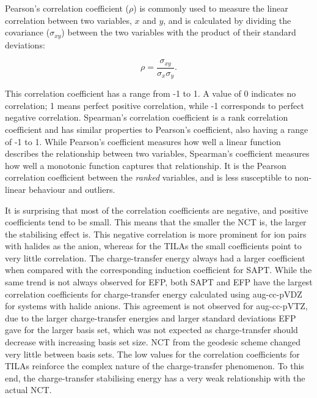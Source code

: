 Pearson's correlation coefficient ($\rho$) is commonly used to measure the linear correlation between two variables, $x$ and $y$, and is calculated by dividing the covariance ($\sigma_{xy}$) between the two variables with the product of their standard deviations:

\begin{equation}
    \rho = \frac{\sigma_{xy}}{\sigma_x \sigma_y}.
\end{equation}

This correlation coefficient has a range from -1 to 1.
A value of 0 indicates no correlation; 1 means perfect positive correlation, while -1 corresponds to perfect negative correlation.
Spearman's correlation coefficient is a rank correlation coefficient and has similar properties to Pearson's coefficient, also having a range of -1 to 1. 
While Pearson's coefficient measures how well a linear function describes the relationship between two variables, Spearman's coefficient measures how well a monotonic function captures that relationship.
It is the Pearson correlation coefficient between the \emph{ranked} variables, and is less susceptible to non-linear behaviour and outliers.


It is surprising that most of the correlation coefficients are negative, and positive coefficients tend to be small.
This means that the smaller the NCT is, the larger the stabilising effect is.
This negative correlation is more prominent for ion pairs with halides as the anion, whereas for the TILAs the small coefficients point to very little correlation.
The charge-transfer energy always had a larger coefficient when compared with the corresponding induction coefficient for SAPT.
While the same trend is not always observed for EFP, both SAPT and EFP have the largest correlation coefficients for charge-transfer energy calculated using aug-cc-pVDZ for systems with halide anions.
This agreement is not observed for aug-cc-pVTZ, due to the larger charge-transfer energies and larger standard deviations EFP gave for the larger basis set, which was not expected as charge-transfer should decrease with increasing basis set size. 
NCT from the geodesic scheme changed very little between basis sets.
The low values for the correlation coefficients for TILAs reinforce the complex nature of the charge-transfer phenomenon.
To this end, the charge-transfer stabilising energy has a very weak relationship with the actual NCT.

